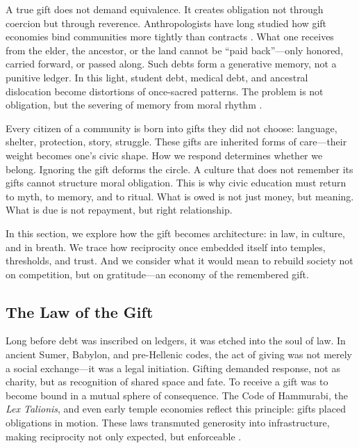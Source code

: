 \documentclass[12pt]{article}
\begin{document}
\vspace{0.4cm}
A true gift does not demand equivalence. It creates obligation not through coercion but through reverence. Anthropologists have long studied how gift economies bind communities more tightly than contracts \parencite{sahlins1972stone}. What one receives from the elder, the ancestor, or the land cannot be “paid back”---only honored, carried forward, or passed along. Such debts form a generative memory, not a punitive ledger. In this light, student debt, medical debt, and ancestral dislocation become distortions of once-sacred patterns. The problem is not obligation, but the severing of memory from moral rhythm \parencite{hyde2019gift}.

\vspace{0.4cm}
Every citizen of a community is born into gifts they did not choose: language, shelter, protection, story, struggle. These gifts are inherited forms of care---their weight becomes one’s civic shape. How we respond determines whether we belong. Ignoring the gift deforms the circle. A culture that does not remember its gifts cannot structure moral obligation. This is why civic education must return to myth, to memory, and to ritual. What is owed is not just money, but meaning. What is due is not repayment, but right relationship.

\vspace{0.4cm}
In this section, we explore how the gift becomes architecture: in law, in culture, and in breath. We trace how reciprocity once embedded itself into temples, thresholds, and trust. And we consider what it would mean to rebuild society not on competition, but on gratitude---an economy of the remembered gift.

\clearpage
\subsection{The Law of the Gift}

Long before debt was inscribed on ledgers, it was etched into the soul of law. In ancient Sumer, Babylon, and pre-Hellenic codes, the act of giving was not merely a social exchange—it was a legal initiation. Gifting demanded response, not as charity, but as recognition of shared space and fate. To receive a gift was to become bound in a mutual sphere of consequence. The Code of Hammurabi, the \textit{Lex Talionis}, and even early temple economies reflect this principle: gifts placed obligations in motion. These laws transmuted generosity into infrastructure, making reciprocity not only expected, but enforceable \parencite{mauss1954gift,rose1994possessory}.
\end{document}
